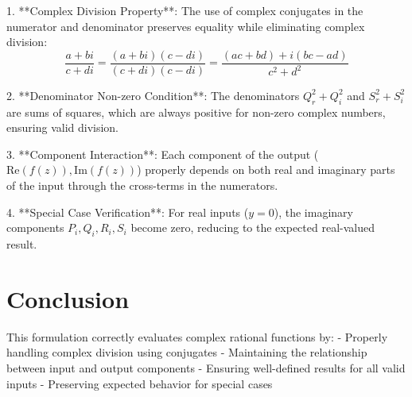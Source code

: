 \documentclass{article}
\begin{document}
1. **Complex Division Property**:
   The use of complex conjugates in the numerator and denominator preserves equality while eliminating complex division:
   \[
   \frac{a + bi}{c + di} = \frac{(a + bi)(c - di)}{(c + di)(c - di)} = \frac{(ac + bd) + i(bc - ad)}{c^2 + d^2}
   \]

2. **Denominator Non-zero Condition**:
   The denominators \( Q_r^2 + Q_i^2 \) and \( S_r^2 + S_i^2 \) are sums of squares, which are always positive for non-zero complex numbers, ensuring valid division.

3. **Component Interaction**:
   Each component of the output (\( \text{Re}(f(z)), \text{Im}(f(z)) \)) properly depends on both real and imaginary parts of the input through the cross-terms in the numerators.

4. **Special Case Verification**:
   For real inputs (\( y = 0 \)), the imaginary components \( P_i, Q_i, R_i, S_i \) become zero, reducing to the expected real-valued result.

\section*{Conclusion}

This formulation correctly evaluates complex rational functions by:
- Properly handling complex division using conjugates
- Maintaining the relationship between input and output components
- Ensuring well-defined results for all valid inputs
- Preserving expected behavior for special cases
\end{document}

